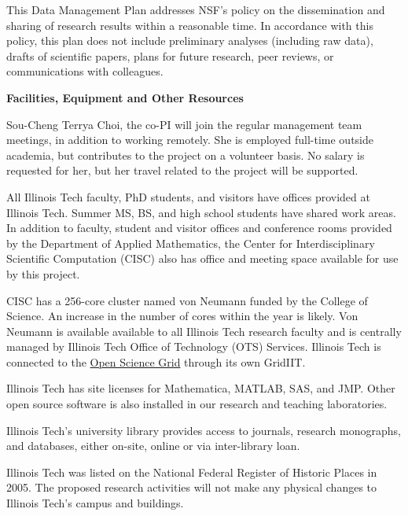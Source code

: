 \documentclass[11pt]{NSFamsart}
\begin{document}
This Data Management Plan addresses NSF’s policy on the dissemination and sharing of research results within a reasonable time.  In accordance with this policy, this plan does not include preliminary analyses (including raw data), drafts of scientific papers, plans for future research, peer reviews, or communications with colleagues. 


\newpage \setcounter{page}{1} %


\centerline{\textbf{\Large Facilities, Equipment and Other Resources}}

\bigskip

Sou-Cheng Terrya Choi, the co-PI will join the regular management team meetings, in addition to working remotely.  She is employed full-time outside academia, but contributes to the project on a volunteer 
basis.  No salary is requested for her, but her travel related to the project will be supported.

All Illinois Tech faculty, PhD students, and visitors have offices provided at Illinois Tech.  Summer MS, BS, and high school students have shared work areas.  In addition to faculty, student and visitor 
offices and conference rooms provided by the Department of Applied Mathematics, the Center for Interdisciplinary Scientific Computation (CISC) also has office and meeting space available for use by this project.

CISC has a 256-core cluster named von Neumann funded by the 
College of Science.  An increase in the number of cores within the year is likely. Von Neumann is available available to all Illinois Tech research faculty and is
centrally managed by Illinois Tech Office of Technology (OTS) Services.  Illinois Tech is connected to the \href{https://www.opensciencegrid.org}{Open Science Grid} through its own GridIIT.  


Illinois Tech has site licenses for Mathematica, MATLAB, SAS, and JMP.  Other open source software is also installed in our research and teaching laboratories.

Illinois Tech's university library provides access to journals, research monographs, and databases, either on-site, online or via inter-library loan.

Illinois Tech was listed on the National Federal Register of Historic Places in 2005. The proposed research activities will not make any physical changes to Illinois Tech's campus and buildings.
\end{document}
